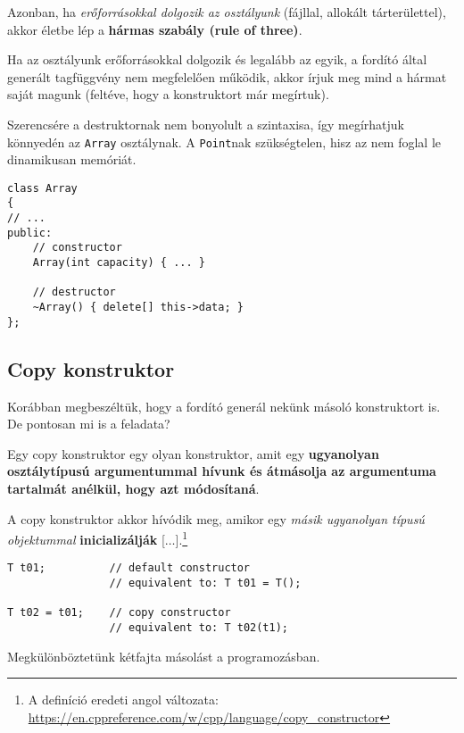 \documentclass[a4paper, 11pt, oneside]{book}
\begin{document}
Azonban, ha \textit{erőforrásokkal dolgozik az osztályunk} (fájllal, allokált tárterülettel), akkor életbe lép a \textbf{hármas szabály (rule of three)}.

\begin{tcolorbox}[title={\textbf{Rule of three}}]
	Ha az osztályunk erőforrásokkal dolgozik és legalább az egyik, a fordító által generált tagfüggvény nem megfelelően működik, akkor írjuk meg mind a hármat saját magunk (feltéve, hogy a konstruktort már megírtuk).
\end{tcolorbox}

Szerencsére a destruktornak nem bonyolult a szintaxisa, így megírhatjuk könnyedén az \verb*|Array| osztálynak. A \verb*|Point|nak szükségtelen, hisz az nem foglal le dinamikusan memóriát.

\begin{lstlisting}[style=cppstyle]
class Array
{
// ... 
public:
	// constructor
	Array(int capacity) { ... }

	// destructor
	~Array() { delete[] this->data; }
};
\end{lstlisting}

\newpage

\subsection{Copy konstruktor}

Korábban megbeszéltük, hogy a fordító generál nekünk másoló konstruktort is. De pontosan mi is a feladata?

\begin{tcolorbox}[title={\textbf{Copy konstruktor}}]
	Egy copy konstruktor egy olyan konstruktor, amit egy \textbf{ugyanolyan osztálytípusú argumentummal hívunk és átmásolja az argumentuma tartalmát anélkül, hogy azt módosítaná}.
	
	A copy konstruktor akkor hívódik meg, amikor egy \textit{másik ugyanolyan típusú objektummal} \textbf{inicializálják} [$\ldots$].\footnote{A definíció eredeti angol változata: \url{https://en.cppreference.com/w/cpp/language/copy_constructor}}
	
	\begin{lstlisting}[style=cppstyle]
T t01;			// default constructor
				// equivalent to: T t01 = T();

T t02 = t01;	// copy constructor
				// equivalent to: T t02(t1);
	\end{lstlisting}
\end{tcolorbox}

Megkülönböztetünk kétfajta másolást a programozásban.
\end{document}
